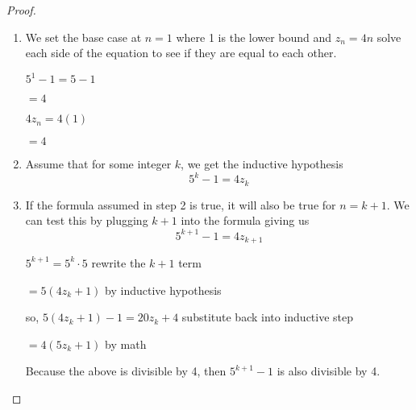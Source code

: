 \documentclass{article}
\begin{document}
      \begin{proof}

        \begin{enumerate}

          \item We set the base case at $n=1$ where 1 is the lower bound 
          and $z_n=4n$ solve each side of the equation to see if 
          they are equal to each other.
          \vspace{.25cm}

            $5^1-1 = 5-1$

            \hspace{1cm}$= 4$
            \vspace{0.5cm}

            $4z_n = 4(1)$ 

            \hspace{1cm}$= 4$
            \vspace{.25cm}

            \item Assume that for some integer $k$, we get the inductive hypothesis
            \[5^k-1 = 4z_k\]

        \item If the formula assumed in step 2 is true, it will also 
        be true for $n = k+1$. We can test this by plugging $k+1$ into
        the formula giving us \[5^{k+1}-1 = 4z_{k+1}\]
        
          $5^{k+1} = 5^k \cdot 5$
          \hspace{3.5cm}rewrite the $k+1$ term


          \hspace{1cm}$= 5(4{z_k+1})$
          \hspace{2.5cm}by inductive hypothesis
          \vspace{.5cm}

          so, $5(4z_k+1)-1 = 20z_k + 4$
          \hspace{1cm}substitute back into inductive step

          \hspace{1cm}$= 4(5z_k + 1)$
          \hspace{2.5cm}by math
          \vspace{.5cm}
          
          Because the above is divisible by 4, then $5^{k+1} -1$ is also 
          divisible by 4.

        \end{enumerate}

      \end{proof}
\end{document}
